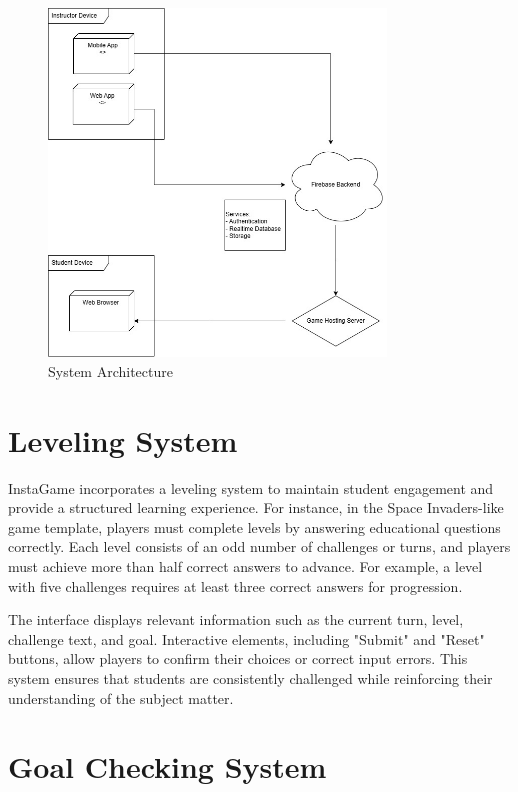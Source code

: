\begin{figure}
	\centering
	\includegraphics[width=0.8\textwidth]{figures/Deployment_UML.jpg}
	\caption{System Architecture}
	\label{fig:architecture}
\end{figure}

\section{Leveling System}

InstaGame incorporates a leveling system to maintain student engagement and provide a structured learning experience. For instance, in the Space Invaders-like game template, players must complete levels by answering educational questions correctly. Each level consists of an odd number of challenges or turns, and players must achieve more than half correct answers to advance. For example, a level with five challenges requires at least three correct answers for progression.

The interface displays relevant information such as the current turn, level, challenge text, and goal. Interactive elements, including "Submit" and "Reset" buttons, allow players to confirm their choices or correct input errors. This system ensures that students are consistently challenged while reinforcing their understanding of the subject matter.

\section{Goal Checking System}

